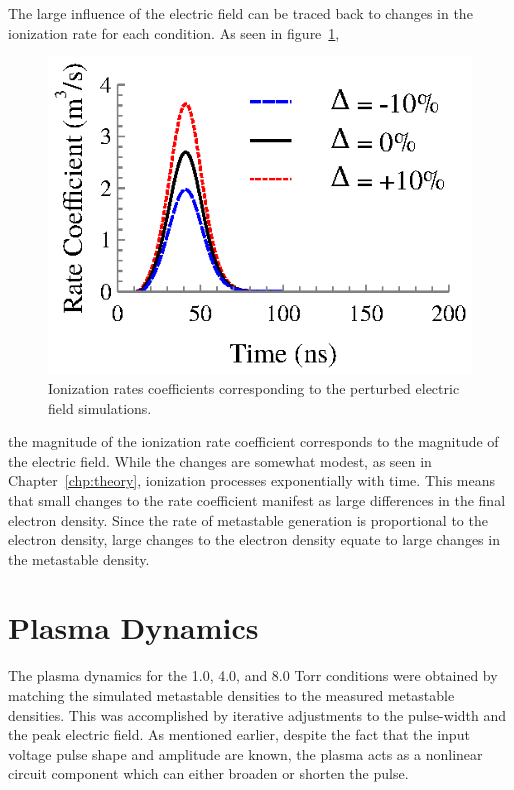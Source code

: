The large influence of the electric field can be traced back to changes in the
ionization rate for each condition. As seen in figure~\ref{fig:ionrates},
\begin{figure}
  \centering
  \includegraphics{./chapters/modeling/figures/ionrates.eps}
  \caption{Ionization rates coefficients corresponding to the perturbed electric
  field simulations.}
  \label{fig:ionrates}
\end{figure}
the magnitude of the ionization rate coefficient corresponds to the magnitude of
the electric field. While the changes are somewhat modest, as seen in
Chapter~\ref{chp:theory}, ionization processes exponentially with time. This
means that small changes to the rate coefficient manifest as large differences
in the final electron density. Since the rate of metastable generation is
proportional to the electron density, large changes to the electron density
equate to large changes in the metastable density.

\section{Plasma Dynamics}

The plasma dynamics for the 1.0, 4.0, and 8.0 Torr conditions were obtained by
matching the simulated metastable densities to the measured metastable
densities. This was accomplished by iterative adjustments to the pulse-width and
the peak electric field. As mentioned earlier, despite the fact that the input
voltage pulse shape and amplitude are known, the plasma acts as a nonlinear
circuit component which can either broaden or shorten the pulse.

